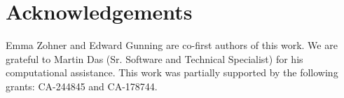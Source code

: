 \section*{Acknowledgements}
Emma Zohner and Edward Gunning are co-first authors of this work.
We are grateful to Martin Das (Sr. Software and Technical Specialist) for his computational assistance.
This work was partially supported by the following grants: CA-244845 and CA-178744.